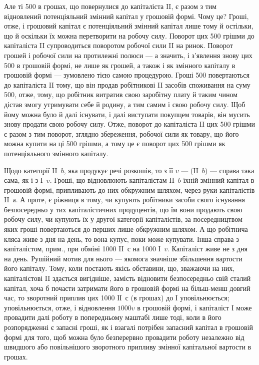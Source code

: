 
Але ті 500 в грошах, що повернулися до капіталіста II, є разом з
тим відновлений потенціяльний змінний капітал у грошовій формі. Чому
це? Гроші, отже, і грошовий капітал є потенціяльний змінний капітал
лише тому й остільки, що й оскільки їх можна перетворити на робочу
силу. Поворот цих 500 грішми до капіталіста II супроводиться
поворотом робочої сили II на ринок. Поворот грошей і робочої сили на
протилежні полюси — а значить, і з’явлення знову цих 500 в грошовій
формі, не лише як грошей, а також і як змінного капіталу в грошовій
формі — зумовлено тією самою процедурою. Гроші \deq{} 500 повертаються до
капіталіста II тому, що він продав робітникові II засобів споживання на
суму 500, отже, тому, що робітник витратив свою заробітну плату й таким
чином дістав змогу утримувати себе й родину, а тим самим і свою
робочу силу. Щоб йому можна було й далі існувати, і далі виступати
покупцем товарів, він мусить знову продати свою робочу силу. Отже,
поворот до капіталіста II цих 500 грішми є разом з тим поворот, зглядно
збереження, робочої сили як товару, що його можна купити на ці 500
грішми, а тому це є поворот цих 500 грішми як потенціяльного змінного
капіталу.

Щодо категорії II~$b$, яка продукує речі розкошів, то з її $v$ —
(II~$b$) — справа така сама, як і з I~$v$. Гроші, що відновлюють капіталістам
II~$b$ їхній змінний капітал в грошовій формі, припливають до них
обкружним шляхом, через руки капіталістів II~$а$. А проте, є ріжниця в
тому, чи купують робітники засоби свого існування безпосередньо у тих
капіталістичних продуцентів, що їм вони продають свою робочу силу, чи
купують їх у другої категорії капіталістів, за посередництвом яких гроші
повертаються до перших лише обкружним шляхом. А що робітнича кляса
живе з дня на день, то вона купує, поки може купувати. Інша справа
з капіталістом, прим., при обміні 1000 II~$с$ на 1000 І~$v$. Капіталіст живе
не з дня на день. Рушійний мотив для нього — якомога значніше збільшення
вартости його капіталу. Тому, коли постають якісь обставини, що,
зважаючи на них, капіталістові II здається вигідніше, замість відновити
безпосередньо свій сталий капітал, хоча б почасти затримати його в
грошовій формі на більш-менш довгий час, то зворотний приплив цих
1000 ІІ~$с$ (в грошах) до І уповільнюється; уповільнюється, отже, і відновлення
$1000 v$ в грошовій формі, і капіталіст І може провадити далі
роботу в попередньому маштабі лише тоді, коли в його розпорядженні
є запасні гроші, як і взагалі потрібен запасний капітал в грошовій формі
для того, щоб можна було безперервно провадити роботу незалежно від
швидшого або повільнішого зворотного припливу змінної капітальної вартости
в грошах.

